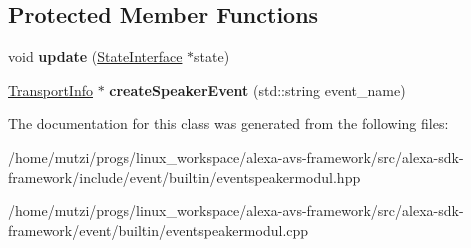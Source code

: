\subsection*{Protected Member Functions}
\begin{DoxyCompactItemize}
\item 
\mbox{\label{classAlexaEvent_1_1EventSpeakerModul_ada79b3de43b9bbc763aa4cc68186de51}} 
void {\bfseries update} (\hyperlink{classAlexaEvent_1_1StateInterface}{State\+Interface} $\ast$state)
\item 
\mbox{\label{classAlexaEvent_1_1EventSpeakerModul_ac36f41ec6ab8a2400b3e0ff0ff312685}} 
\hyperlink{classAlexaEvent_1_1TransportInfo}{Transport\+Info} $\ast$ {\bfseries create\+Speaker\+Event} (std\+::string event\+\_\+name)
\end{DoxyCompactItemize}


The documentation for this class was generated from the following files\+:\begin{DoxyCompactItemize}
\item 
/home/mutzi/progs/linux\+\_\+workspace/alexa-\/avs-\/framework/src/alexa-\/sdk-\/framework/include/event/builtin/eventspeakermodul.\+hpp\item 
/home/mutzi/progs/linux\+\_\+workspace/alexa-\/avs-\/framework/src/alexa-\/sdk-\/framework/event/builtin/eventspeakermodul.\+cpp\end{DoxyCompactItemize}
